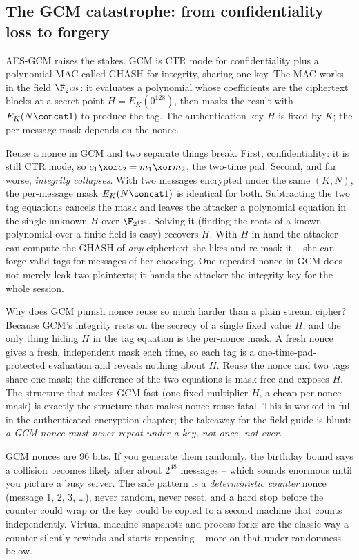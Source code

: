 \subsection{The GCM catastrophe: from confidentiality loss to forgery}
\label{ch38:gcm-nonce}

AES-GCM raises the stakes. GCM is CTR mode for confidentiality plus a polynomial MAC called GHASH for integrity, sharing one key. The MAC works in the field $\F_{2^{128}}$: it evaluates a polynomial whose coefficients are the ciphertext blocks at a secret point $H = E_K(0^{128})$, then masks the result with $E_K(N \concat 1)$ to produce the tag. The authentication key $H$ is fixed by $K$; the per-message mask depends on the nonce.

Reuse a nonce in GCM and two separate things break. First, confidentiality: it is still CTR mode, so $c_1 \xor c_2 = m_1 \xor m_2$, the two-time pad. Second, and far worse, \emph{integrity collapses}. With two messages encrypted under the same $(K,N)$, the per-message mask $E_K(N\concat 1)$ is identical for both. Subtracting the two tag equations cancels the mask and leaves the attacker a polynomial equation in the single unknown $H$ over $\F_{2^{128}}$. Solving it (finding the roots of a known polynomial over a finite field is easy) recovers $H$. With $H$ in hand the attacker can compute the GHASH of \emph{any} ciphertext she likes and re-mask it -- she can forge valid tags for messages of her choosing. One repeated nonce in GCM does not merely leak two plaintexts; it hands the attacker the integrity key for the whole session.

\begin{whybox}
Why does GCM punish nonce reuse so much harder than a plain stream cipher? Because GCM's integrity rests on the secrecy of a single fixed value $H$, and the only thing hiding $H$ in the tag equation is the per-nonce mask. A fresh nonce gives a fresh, independent mask each time, so each tag is a one-time-pad-protected evaluation and reveals nothing about $H$. Reuse the nonce and two tags share one mask; the difference of the two equations is mask-free and exposes $H$. The structure that makes GCM fast (one fixed multiplier $H$, a cheap per-nonce mask) is exactly the structure that makes nonce reuse fatal. This is worked in full in the authenticated-encryption chapter; the takeaway for the field guide is blunt: \emph{a GCM nonce must never repeat under a key, not once, not ever.}
\end{whybox}

\begin{focusbox}
GCM nonces are 96 bits. If you generate them randomly, the birthday bound says a collision becomes likely after about $2^{48}$ messages -- which sounds enormous until you picture a busy server. The safe pattern is a \emph{deterministic counter} nonce (message 1, 2, 3, \dots), never random, never reset, and a hard stop before the counter could wrap or the key could be copied to a second machine that counts independently. Virtual-machine snapshots and process forks are the classic way a counter silently rewinds and starts repeating -- more on that under randomness below.
\end{focusbox}


